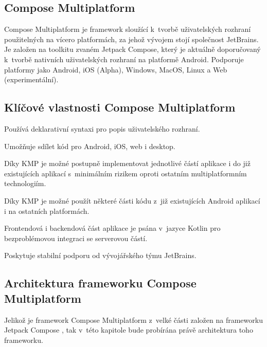 \subsection{Compose Multiplatform}

Compose Multiplatform je framework sloužící k~tvorbě uživatelských rozhraní použitelných na vícero platformách, za 
jehož vývojem stojí společnost JetBrains. \cite{composeMultiplatform} Je založen na toolkitu zvaném Jetpack Compose, který je aktuálně 
doporučovaný k~tvorbě nativních uživatelských rozhraní na platformě Android. \cite{jetpack}
Podporuje platformy jako Android, iOS (Alpha), Windows, MacOS, Linux a Web (experimentální). \cite{composeMultiplatform}

\medskip

\subsection*{Klíčové vlastnosti Compose Multiplatform}

Používá deklarativní syntaxi pro popis uživatelského rozhraní. \cite{KMPUseCases}

Umožňuje sdílet kód pro Android, iOS, web i desktop. \cite{composeMultiplatform}

Díky KMP je možné postupně implementovat jednotlivé částí aplikace i do již existujících aplikací s~minimálním rizikem oproti
ostatním multiplatformním technologiím. \cite{KMP}

Díky KMP je možné použít některé části kódu z~již existujících Android aplikací i na ostatních platformách.

Frontendová i backendová část aplikace je psána v~jazyce Kotlin pro bezproblémovou integraci se serverovou částí.

Poskytuje stabilní podporu od vývojářského týmu JetBrains.

\subsection*{Architektura frameworku Compose Multiplatform} \label{ComposeArch}
Jelikož je framework Compose Multiplatform z~velké části založen na frameworku Jetpack Compose \cite{composeMultiplatform}, tak v~této kapitole bude probírána
právě architektura toho frameworku. 


